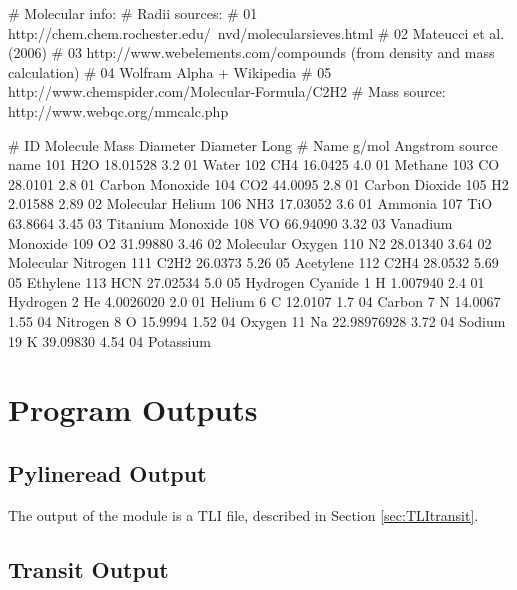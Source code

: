 \documentclass[letterpaper, 12pt]{article}
\begin{document}
\begin{plain}
# Molecular info:
# Radii sources:
# 01  http://chem.chem.rochester.edu/~nvd/molecularsieves.html
# 02  Mateucci et al. (2006)
# 03  http://www.webelements.com/compounds (from density and mass calculation)
# 04  Wolfram Alpha + Wikipedia
# 05  http://www.chemspider.com/Molecular-Formula/C2H2
# Mass source: http://www.webqc.org/mmcalc.php

# ID    Molecule  Mass         Diameter  Diameter   Long
#       Name      g/mol        Angstrom  source     name
 101    H2O       18.01528     3.2       01         Water
 102    CH4       16.0425      4.0       01         Methane
 103    CO        28.0101      2.8       01         Carbon Monoxide
 104    CO2       44.0095      2.8       01         Carbon Dioxide
 105    H2         2.01588     2.89      02         Molecular Helium
 106    NH3       17.03052     3.6       01         Ammonia
 107    TiO       63.8664      3.45      03         Titanium Monoxide
 108    VO        66.94090     3.32      03         Vanadium Monoxide
 109    O2        31.99880     3.46      02         Molecular Oxygen
 110    N2        28.01340     3.64      02         Molecular Nitrogen
 111    C2H2      26.0373      5.26      05         Acetylene
 112    C2H4      28.0532      5.69      05         Ethylene
 113    HCN       27.02534     5.0       05         Hydrogen Cyanide
   1    H          1.007940    2.4       01         Hydrogen
   2    He         4.0026020   2.0       01         Helium
   6    C         12.0107      1.7       04         Carbon
   7    N         14.0067      1.55      04         Nitrogen
   8    O         15.9994      1.52      04         Oxygen
  11    Na        22.98976928  3.72      04         Sodium
  19    K         39.09830     4.54      04         Potassium
\end{plain}


\section{Program Outputs}
\label{sec:outputs}

\subsection{Pylineread Output}
\label{sec:pyline-out}

The output of the {\pylineread} module is a TLI file, described in
Section \ref{sec:TLItransit}.

\subsection{Transit Output}
\label{sec:tran-out}
\end{document}
